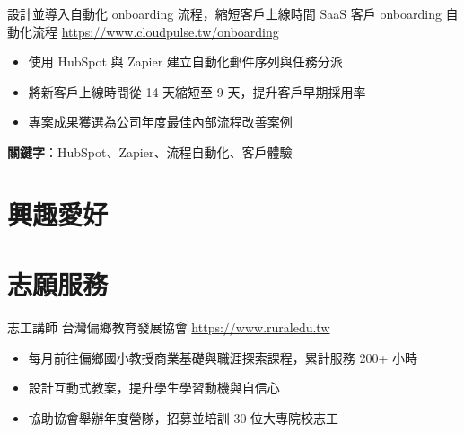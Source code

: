 \documentclass[a4paper, serif, 10pt]{moderncv}
\begin{document}
        {設計並導入自動化 onboarding 流程，縮短客戶上線時間}
        {SaaS 客戶 onboarding 自動化流程}
        {\url{https://www.cloudpulse.tw/onboarding}}
        {}
        {\begin{itemize}
\item 使用 HubSpot 與 Zapier 建立自動化郵件序列與任務分派
\item 將新客戶上線時間從 14 天縮短至 9 天，提升客戶早期採用率
\item 專案成果獲選為公司年度最佳內部流程改善案例
\end{itemize}
\textbf{關鍵字}：HubSpot、Zapier、流程自動化、客戶體驗}
\section{興趣愛好}

\section{志願服務}

        {志工講師}
        {台灣偏鄉教育發展協會}
        {\url{https://www.ruraledu.tw}}
        {}
        {\begin{itemize}
\item 每月前往偏鄉國小教授商業基礎與職涯探索課程，累計服務 200+ 小時
\item 設計互動式教案，提升學生學習動機與自信心
\item 協助協會舉辦年度營隊，招募並培訓 30 位大專院校志工
\end{itemize}}
    
\end{document}

